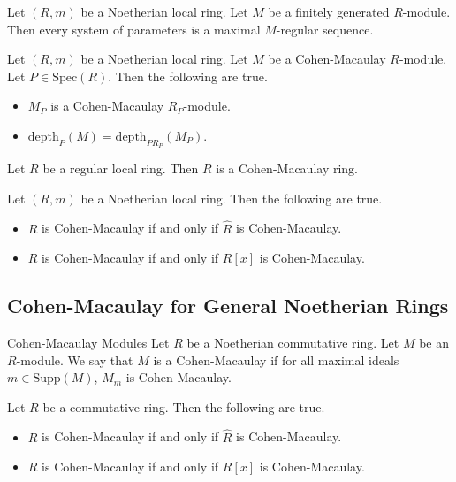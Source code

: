 \documentclass[a4paper]{article}
\begin{document}
\begin{prp}{}{} Let $(R,m)$ be a Noetherian local ring. Let $M$ be a finitely generated $R$-module. Then every system of parameters is a maximal $M$-regular sequence. 
\end{prp}

\begin{prp}{}{} Let $(R,m)$ be a Noetherian local ring. Let $M$ be a Cohen-Macaulay $R$-module. Let $P\in\text{Spec}(R)$. Then the following are true. 
\begin{itemize}
\item $M_P$ is a Cohen-Macaulay $R_P$-module. 
\item $\text{depth}_P(M)=\text{depth}_{PR_P}(M_P)$. 
\end{itemize}
\end{prp}

\begin{lmm}{}{} Let $R$ be a regular local ring. Then $R$ is a Cohen-Macaulay ring. 
\end{lmm}

\begin{prp}{}{} Let $(R,m)$ be a Noetherian local ring. Then the following are true. 
\begin{itemize}
\item $R$ is Cohen-Macaulay if and only if $\widehat{R}$ is Cohen-Macaulay. 
\item $R$ is Cohen-Macaulay if and only if $R[x]$ is Cohen-Macaulay. 
\end{itemize}
\end{prp}

\subsection{Cohen-Macaulay for General Noetherian Rings}
\begin{defn}{Cohen-Macaulay Modules}{} Let $R$ be a Noetherian commutative ring. Let $M$ be an $R$-module. We say that $M$ is a Cohen-Macaulay if for all maximal ideals $m\in\text{Supp}(M)$, $M_m$ is Cohen-Macaulay. 
\end{defn}

\begin{prp}{}{} Let $R$ be a commutative ring. Then the following are true. 
\begin{itemize}
\item $R$ is Cohen-Macaulay if and only if $\widehat{R}$ is Cohen-Macaulay. 
\item $R$ is Cohen-Macaulay if and only if $R[x]$ is Cohen-Macaulay. 
\end{itemize}
\end{prp}
\end{document}
